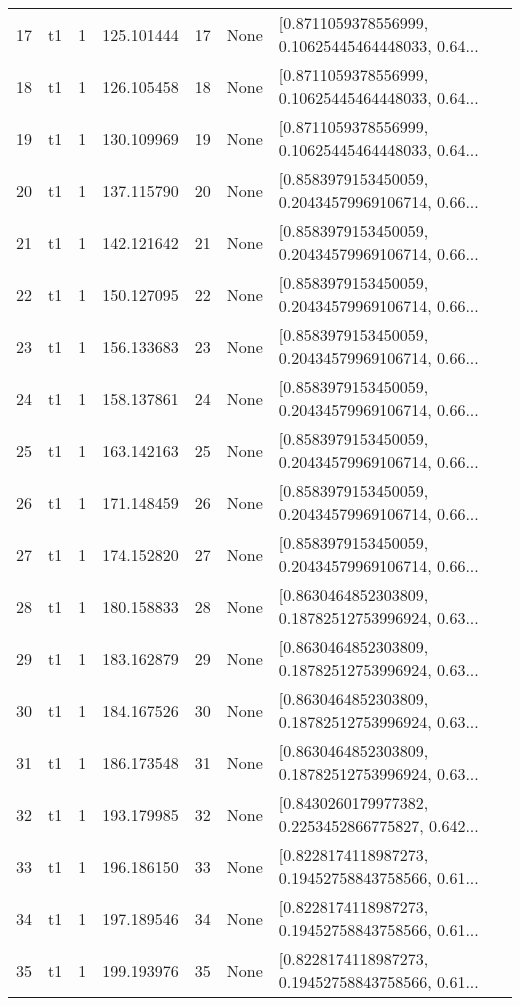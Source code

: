 \begin{tabular}{lllrlll}
17  &  t1 &   1 &  125.101444 &   17 &  None &  [0.8711059378556999, 0.10625445464448033, 0.64... \\
18  &  t1 &   1 &  126.105458 &   18 &  None &  [0.8711059378556999, 0.10625445464448033, 0.64... \\
19  &  t1 &   1 &  130.109969 &   19 &  None &  [0.8711059378556999, 0.10625445464448033, 0.64... \\
20  &  t1 &   1 &  137.115790 &   20 &  None &  [0.8583979153450059, 0.20434579969106714, 0.66... \\
21  &  t1 &   1 &  142.121642 &   21 &  None &  [0.8583979153450059, 0.20434579969106714, 0.66... \\
22  &  t1 &   1 &  150.127095 &   22 &  None &  [0.8583979153450059, 0.20434579969106714, 0.66... \\
23  &  t1 &   1 &  156.133683 &   23 &  None &  [0.8583979153450059, 0.20434579969106714, 0.66... \\
24  &  t1 &   1 &  158.137861 &   24 &  None &  [0.8583979153450059, 0.20434579969106714, 0.66... \\
25  &  t1 &   1 &  163.142163 &   25 &  None &  [0.8583979153450059, 0.20434579969106714, 0.66... \\
26  &  t1 &   1 &  171.148459 &   26 &  None &  [0.8583979153450059, 0.20434579969106714, 0.66... \\
27  &  t1 &   1 &  174.152820 &   27 &  None &  [0.8583979153450059, 0.20434579969106714, 0.66... \\
28  &  t1 &   1 &  180.158833 &   28 &  None &  [0.8630464852303809, 0.18782512753996924, 0.63... \\
29  &  t1 &   1 &  183.162879 &   29 &  None &  [0.8630464852303809, 0.18782512753996924, 0.63... \\
30  &  t1 &   1 &  184.167526 &   30 &  None &  [0.8630464852303809, 0.18782512753996924, 0.63... \\
31  &  t1 &   1 &  186.173548 &   31 &  None &  [0.8630464852303809, 0.18782512753996924, 0.63... \\
32  &  t1 &   1 &  193.179985 &   32 &  None &  [0.8430260179977382, 0.2253452866775827, 0.642... \\
33  &  t1 &   1 &  196.186150 &   33 &  None &  [0.8228174118987273, 0.19452758843758566, 0.61... \\
34  &  t1 &   1 &  197.189546 &   34 &  None &  [0.8228174118987273, 0.19452758843758566, 0.61... \\
35  &  t1 &   1 &  199.193976 &   35 &  None &  [0.8228174118987273, 0.19452758843758566, 0.61... \\

\end{tabular}
